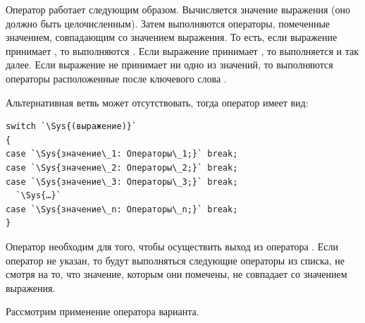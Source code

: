 Оператор работает следующим образом. Вычисляется значение выражения (оно должно быть целочисленным). Затем выполняются
операторы, помеченные значением, совпадающим со значением выражения. То есть, если выражение принимает
, то выполняются . Если выражение принимает
, то выполняется  и так далее. Если выражение не принимает
ни одно из значений, то выполняются операторы расположенные после ключевого слова .

Альтернативная ветвь  может отсутствовать, тогда оператор имеет вид:
\begin{lstlisting}
switch `\Sys{(выражение)}`
{
case `\Sys{значение\_1: Операторы\_1;}` break;
case `\Sys{значение\_2: Операторы\_2;}` break;
case `\Sys{значение\_3: Операторы\_3;}` break;
  `\Sys{…}`
case `\Sys{значение\_n: Операторы\_n;}` break;
}
\end{lstlisting}

Оператор  необходим для того, чтобы осуществить выход из оператора .
Если оператор  не указан, то будут выполняться следующие операторы из списка, не смотря на то,
что значение, которым они помечены, не совпадает со значением выражения.

Рассмотрим применение оператора варианта.


